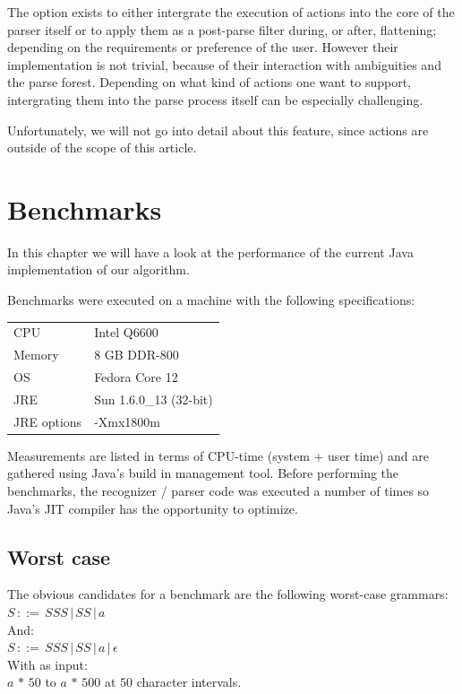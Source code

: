 \documentclass[a4paper,10pt]{article}
\begin{document}
The option exists to either intergrate the execution of actions into the core of the parser itself or to apply them as a post-parse filter during, or after, flattening; depending on the requirements or preference of the user. However their implementation is not trivial, because of their interaction with ambiguities and the parse forest. Depending on what kind of actions one want to support, intergrating them into the parse process itself can be especially challenging.

Unfortunately, we will not go into detail about this feature, since actions are outside of the scope of this article.

\section{Benchmarks}

In this chapter we will have a look at the performance of the current Java implementation of our algorithm.

Benchmarks were executed on a machine with the following specifications:
\begin{table}[H]
\centering
\begin{tabular}{ | p{6em} | p{9em} | }
 \hline
 CPU & Intel Q6600 \\
 Memory & 8 GB DDR-800 \\
 OS & Fedora Core 12 \\
 JRE & Sun 1.6.0\_13 (32-bit) \\
 JRE options & -Xmx1800m \\
 \hline
\end{tabular}
\end{table}

Measurements are listed in terms of CPU-time (system + user time) and are gathered using Java's build in management tool. Before performing the benchmarks, the recognizer / parser code was executed a number of times so Java's JIT compiler has the opportunity to optimize.

\subsection{Worst case}

The obvious candidates for a benchmark are the following worst-case grammars:
$S\,::=\,SSS\,|\,SS\,|\,a$\\
And:\\
$S\,::=\,SSS\,|\,SS\,|\,a\,|\,\epsilon$\\
With as input:\\
$a\,*\,50$ to $a\,*\,500$ at $50$ character intervals.
\end{document}
